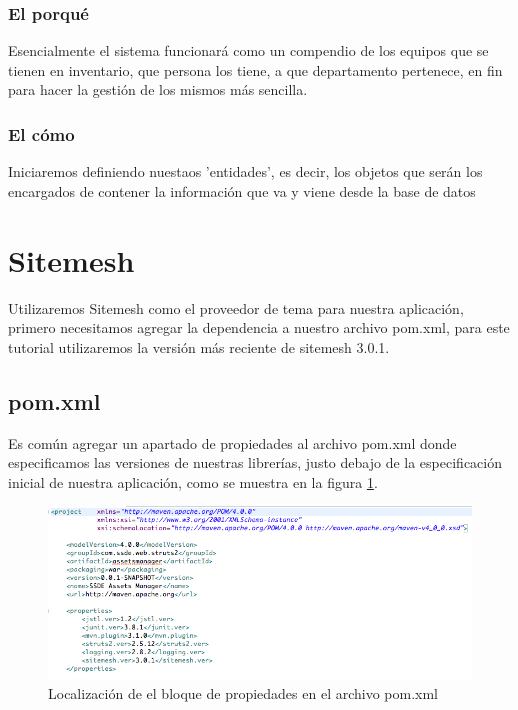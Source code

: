\documentclass[12pt,a4paper]{article}
\begin{document}
		\subsubsection{El porqu\'e}
		Esencialmente el sistema funcionar\'a como un compendio de los equipos que se tienen en inventario, que persona los tiene, a que departamento pertenece, en fin para hacer la gesti\'on de los mismos m\'as sencilla.\\ \par
		\newpage
		\subsubsection{El c\'omo}
		Iniciaremos definiendo nuestaos 'entidades', es decir, los objetos que ser\'an los encargados de contener la informaci\'on que va y viene desde la base de datos\\ \par
        \newpage
    \section{Sitemesh}
		Utilizaremos Sitemesh como el proveedor de tema para nuestra aplicaci\'on, primero necesitamos agregar la dependencia a nuestro archivo pom.xml, para este tutorial utilizaremos la versi\'on m\'as reciente de sitemesh 3.0.1.\\
		\subsection{pom.xml}
		Es com\'un agregar un apartado de propiedades al archivo pom.xml donde especificamos las versiones de nuestras librer\'ias, justo debajo de la especificaci\'on inicial de nuestra aplicaci\'on, como se muestra en la figura \ref{05_pom_xml}.
        \begin{figure}[h]
            \centering
            \includegraphics[scale=0.4]{05_pom_xml}
            \caption{Localizaci\'on de el bloque de propiedades en el archivo pom.xml}
            \label{05_pom_xml}
        \end{figure}
        
\end{document}
